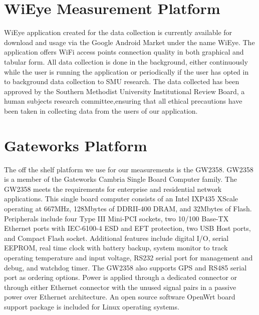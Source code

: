 \section{WiEye Measurement Platform}
WiEye application created for the data collection is currently available for download and usage via the Google Android 
Market under the name WiEye. The application offers WiFi access points connection quality in both graphical and tabular 
form. All data collection is done in the background, either continuously while the user is running the application or 
periodically if the user has opted in to background data collection to SMU research. 
The data collected has been approved by the Southern Methodist University Institutional Review Board, a human subjects 
research committee,ensuring that all ethical precautions have been taken in collecting data from the users of our 
application.






\section{Gateworks Platform}

The off the shelf platform we use for our measurements is the GW2358. 
GW2358 is a member of the Gateworks Cambria Single Board Computer family. 
The GW2358 meets the requirements for enterprise and residential network 
applications. This single board computer consists of an Intel IXP435 XScale 
operating at 667MHz, 128Mbytes of DDRII-400 DRAM, and 32Mbytes of Flash. 
Peripherals include four Type III Mini-PCI sockets, two 10/100 Base-TX 
Ethernet ports with IEC-6100-4 ESD and EFT protection, two USB Host ports, 
and Compact Flash socket. Additional features include digital I/O, serial 
EEPROM, real time clock with battery backup, system monitor to track 
operating temperature and input voltage, RS232 serial port for management 
and debug, and watchdog timer. The GW2358 also supports GPS and RS485 
serial port as ordering options. Power is applied through a dedicated 
connector or through either Ethernet connector with the unused signal 
pairs in a passive power over Ethernet architecture. 
An open source software OpenWrt board support package is included 
for Linux operating systems.


